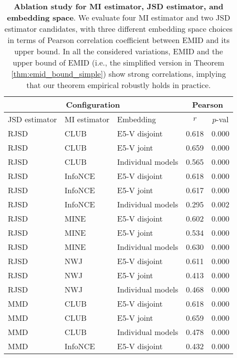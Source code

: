 \begin{table}[htb]
\caption{\textbf{Ablation study for MI estimator, JSD estimator, and embedding space}. We evaluate four MI estimator and two JSD estimator candidates, with three different embedding space choices in terms of Pearson correlation coefficient between EMID and its upper bound. In all the considered variations, EMID and the upper bound of EMID (i.e., the simplified version in Theorem \ref{thm:emid_bound_simple}) show strong correlations, implying that our theorem empirical robustly holds in practice.}
\small
\centering
\begin{tabular}{@{}lll|cc@{}}
\toprule
\multicolumn{3}{c}{Configuration} &
  \multicolumn{2}{c}{Pearson} \\ \midrule
JSD estimator & MI estimator & Embedding         & $r$     & $p$-val  \\ \midrule
RJSD          & CLUB         & E5-V disjoint      & 0.618 & 0.000 \\
RJSD          & CLUB         & E5-V joint         & 0.659 & 0.000 \\
RJSD          & CLUB         & Individual models & 0.565 & 0.000 \\
RJSD          & InfoNCE      & E5-V disjoint      & 0.618 & 0.000 \\
RJSD          & InfoNCE      & E5-V joint         & 0.617 & 0.000 \\
RJSD          & InfoNCE      & Individual models & 0.295 & 0.002 \\
RJSD          & MINE         & E5-V disjoint      & 0.602 & 0.000 \\
RJSD          & MINE         & E5-V joint         & 0.534 & 0.000 \\
RJSD          & MINE         & Individual models & 0.630 & 0.000 \\
RJSD          & NWJ          & E5-V disjoint      & 0.611 & 0.000 \\
RJSD          & NWJ          & E5-V joint         & 0.413 & 0.000 \\
RJSD          & NWJ          & Individual models & 0.468 & 0.000 \\ \midrule
MMD           & CLUB         & E5-V disjoint      & 0.618 & 0.000 \\
MMD           & CLUB         & E5-V joint         & 0.659 & 0.000 \\
MMD           & CLUB         & Individual models & 0.478 & 0.000 \\
MMD           & InfoNCE      & E5-V disjoint      & 0.432 & 0.000 \\

\end{tabular}
\end{table}
